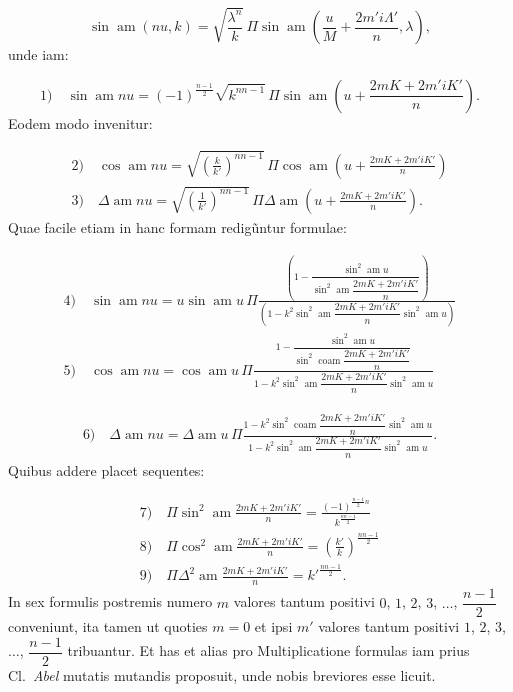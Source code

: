 \documentclass{article}
\begin{document}
\[
\sin\operatorname{am}(nu,k)=\sqrt{\frac{\lambda^{n}}{k}}\,\Pi\sin\operatorname{am}\left(\frac{u}{M}+\frac{2m'i\Lambda'}{n},\lambda\right),
\]
unde iam:

\[
\text{1)}\quad\sin\operatorname{am}nu=(-1)^{\frac{n-1}{2}}\sqrt{k^{nn-1}}\,\Pi\sin\operatorname{am}\left(u+\frac{2mK+2m'iK'}{n}\right).
\]
Eodem modo invenitur:

\[
\begin{gathered}
\text{2)}\quad\cos\operatorname{am}nu=\sqrt{\left(\frac{k}{k'}\right)^{nn-1}}\,\Pi\cos\operatorname{am}\left(u+\frac{2mK+2m'iK'}{n}\right)\\[1.5ex]
\text{3)}\quad\Delta\operatorname{am}nu=\sqrt{\left(\frac{1}{k'}\right)^{nn-1}}\,\Pi\Delta\operatorname{am}\left(u+\frac{2mK+2m'iK'}{n}\right).
\end{gathered}
\]
Quae facile etiam in hanc formam redigũntur formulae:

\[
\begin{gathered}
\text{4)}\quad\sin\operatorname{am}nu=u\sin\operatorname{am}u\,\Pi\frac{\left(1-\dfrac{\sin^{2}\operatorname{am}u}{\sin^{2}\operatorname{am}\dfrac{2mK+2m'iK'}{n}}\right)}{\left(1-k^{2}\sin^{2}\operatorname{am}\dfrac{2mK+2m'iK'}{n}\sin^{2}\operatorname{am}u\right)}\\[2ex]
\text{5)}\quad\cos\operatorname{am}nu=\cos\operatorname{am}u\,\Pi\frac{1-\dfrac{\sin^{2}\operatorname{am}u}{\sin^{2}\operatorname{coam}\dfrac{2mK+2m'iK'}{n}}}{1-k^{2}\sin^{2}\operatorname{am}\dfrac{2mK+2m'iK'}{n}\sin^{2}\operatorname{am}u}
\end{gathered}
\]

\[
\begin{gathered}
\text{6)}\quad\Delta\operatorname{am}nu=\Delta\operatorname{am}u\,\Pi\frac{1-k^{2}\sin^{2}\operatorname{coam}\dfrac{2mK+2m'iK'}{n}\sin^{2}\operatorname{am}u}{1-k^{2}\sin^{2}\operatorname{am}\dfrac{2mK+2m'iK'}{n}\sin^{2}\operatorname{am}u}.
\end{gathered}
\]
Quibus addere placet sequentes:

\[
\begin{gathered}
\text{7)}\quad\Pi\sin^{2}\operatorname{am}\frac{2mK+2m'iK'}{n}=\frac{(-1)^{\frac{n-1}{2}n}}{k^{\frac{nn-1}{2}}}\\[1.5ex]
\text{8)}\quad\Pi\cos^{2}\operatorname{am}\frac{2mK+2m'iK'}{n}=\left(\frac{k'}{k}\right)^{\frac{nn-1}{2}}\\[1.5ex]
\text{9)}\quad\Pi\Delta^{2}\operatorname{am}\frac{2mK+2m'iK'}{n}=k'^{\frac{nn-1}{2}}.
\end{gathered}
\]
In sex formulis postremis numero $m$ valores tantum positivi $0$, $1$, $2$, $3$, $\ldots$, $\dfrac{n-1}{2}$ conveniunt, ita tamen ut quoties $m=0$ et ipsi $m'$ valores tantum positivi $1$, $2$, $3$, $\ldots$, $\dfrac{n-1}{2}$ tribuantur. Et has et alias pro Multiplicatione formulas iam prius Cl.\ \emph{Abel} mutatis mutandis proposuit, unde nobis breviores esse licuit.
\end{document}

